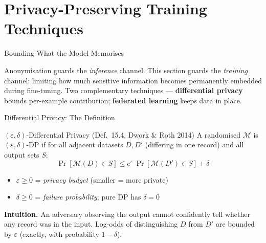 \documentclass[9pt,t]{beamer}
\begin{document}
\section{Privacy-Preserving Training Techniques}

\begin{frame}{Bounding What the Model Memorises}
\begin{bigpicture}
Anonymisation guards the \emph{inference} channel. This section guards the
\emph{training} channel: limiting how much sensitive information becomes permanently
embedded during fine-tuning. Two complementary techniques ---
\textbf{differential privacy} bounds per-example contribution; \textbf{federated
learning} keeps data in place.
\end{bigpicture}
\end{frame}

\begin{frame}{Differential Privacy: The Definition}
\begin{block}{$(\varepsilon,\delta)$-Differential Privacy (Def.\ 15.4, Dwork \& Roth 2014)}
A randomised $\mathcal{M}$ is $(\varepsilon,\delta)$-DP if for all adjacent datasets
$D, D'$ (differing in one record) and all output sets $S$:
\[
\Pr[\mathcal{M}(D) \in S] \leq e^{\varepsilon}\,\Pr[\mathcal{M}(D') \in S] + \delta
\]
\end{block}
\begin{itemize}
  \item $\varepsilon \geq 0$ = \emph{privacy budget} (smaller = more private)
  \item $\delta \geq 0$ = \emph{failure probability}; pure DP has $\delta = 0$
\end{itemize}

\medskip
\textbf{Intuition.} An adversary observing the output cannot confidently tell whether
any record was in the input. Log-odds of distinguishing $D$ from $D'$ are bounded by
$\varepsilon$ (exactly, with probability $1-\delta$).
\end{frame}
\end{document}
